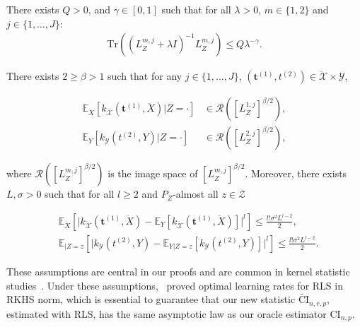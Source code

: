 \begin{assump}
\label{ass:spectrum}
There exists $Q>0$, and $\gamma\in[0,1]$ such that for all $\lambda>0$, $m\in\{1,2\}$ and $j\in\{1,\dots,J\}$:
\begin{align*}
    \text{Tr}((L^{m,j}_{Z}+\lambda I)^{-1}L^{m,j}_{Z})\leq Q \lambda^{-\gamma}.
\end{align*}
\end{assump}

\begin{assump}
\label{ass:source}
There exists $2\geq \beta>1$ such that for any  $j\in\{1,\dots,J\}$,
$(\mathbf{t}^{(1)},t^{(2)})\in\mathcal{\ddot{X}}\times\mathcal{Y}$, 
\begin{small}
\begin{align*}
    \mathbb{E}_{\ddot{X}}\left[k_{\mathcal{\ddot{X}}}(\mathbf{t}^{(1)},\ddot{X})|Z=\cdot\right]&\in \mathcal{R}\left(\left[L^{1,j}_{Z}\right]^{\beta/2}\right),\\
    \mathbb{E}_{Y}\left[k_{\mathcal{Y}}(t^{(2)},Y)|Z=\cdot\right]&\in \mathcal{R}\left(\left[L^{2,j}_{Z}\right]^{\beta/2}\right),
\end{align*}
\end{small}
where $\mathcal{R}\left(\left[L^{m,j}_{Z}\right]^{\beta/2}\right)$ is the image space of $\left[L^{m,j}_{Z}\right]^{\beta/2}$. Moreover, there exists $L,\sigma>0$ such that for all $l\geq 2$ and  $P_Z$-almost all $z\in\mathcal{Z}$
\begin{small}
\begin{align*}
    &\mathbb{E}_{\ddot{X}}\left[\Big|k_{\mathcal{\ddot{X}}}(\mathbf{t}^{(1)},\ddot{X})-  \mathbb{E}_{Y}\left[k_{\mathcal{\ddot{X}}}(\mathbf{t}^{(1)},\ddot{X})\right]\Big|^{l}\right]\leq \frac{l!\sigma^2L^{l-2}}{2},\\
      &\mathbb{E}_{\mid Z=z}\left[\Big|k_{\mathcal{Y}}(t^{(2)},Y)-  \mathbb{E}_{Y|Z=z}\left[k_{\mathcal{Y}}(t^{(2)},Y)\right]\Big|^{l}\right]\leq \frac{l!\sigma^2L^{l-2}}{2}.
\end{align*}
\end{small}
\end{assump}

These assumptions are central in our proofs and are common in kernel statistic studies~\citep{caponnetto2007optimal,fischer2020sobolev,rudi2017generalization}. Under these assumptions,~\cite{fischer2020sobolev} proved optimal learning rates for RLS in RKHS norm, which is essential to guarantee that our new statistic $\widetilde{\text{CI}}_{n,r,p}$, estimated with RLS, has the same asymptotic law as our oracle estimator $\text{CI}_{n,p}$.  



